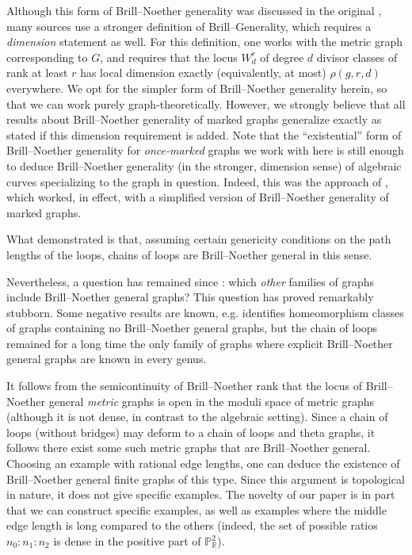 \begin{rema}
Although this form of Brill--Noether generality was discussed in the original \cite{BakerSpec}, many sources use a stronger definition of Brill--Generality, which requires a \emph{dimension} statement as well. For this definition, one works with the metric graph corresponding to $G$, and requires that the locus $W^r_d$ of degree $d$ divisor classes of rank at least $r$ has local dimension exactly (equivalently, at most) $\rho(g,r,d)$ everywhere. We opt for the simpler form of Brill--Noether generality herein, so that we can work purely graph-theoretically. However, we strongly believe that all results about Brill--Noether generality of marked graphs generalize exactly as stated if this dimension requirement is added. Note that the ``existential'' form of Brill--Noether generality for \emph{once-marked} graphs we work with here is still enough to deduce Brill--Noether generality (in the stronger, dimension sense) of algebraic curves specializing to the graph in question. Indeed, this was the approach of \cite{CDPR12}, which worked, in effect, with a simplified version of Brill--Noether generality of marked graphs.
\end{rema}

What \cite{CDPR12} demonstrated is that, assuming certain genericity conditions on the path lengths of the loops, chains of loops are Brill--Noether general in this sense.

Nevertheless, a question has remained since \cite{CDPR12}: which \emph{other} families of graphs include Brill--Noether general graphs? This question has proved remarkably stubborn. Some negative results are known, e.g. \cite{jensenNotDense} identifies homeomorphism classes of graphs containing no Brill--Noether general graphs, but the chain of loops remained for a long time the only family of graphs where explicit Brill--Noether general graphs are known in every genus.

\begin{rema}
It follows from the semicontinuity of Brill--Noether rank \cite{lpp,len14} that the locus of Brill--Noether general \emph{metric} graphs is open in the moduli space of metric graphs (although it is not dense, in contrast to the algebraic setting). Since a chain of loops (without bridges) may deform to a chain of loops and theta graphs, it follows there exist some such metric graphs that are Brill--Noether general. 
Choosing an example with rational edge lengths, one can deduce the existence of Brill--Noether general finite graphs of this type. Since this argument is topological in nature, it does not give specific examples. The novelty of our paper is in part that we can construct specific examples, as well as examples where the middle edge length is long compared to the others (indeed, the set of possible ratios $n_0 : n_1 : n_2$ is dense in the positive part of $\mathbb{P}^2_{\mathbb{R}}$).
\end{rema}

